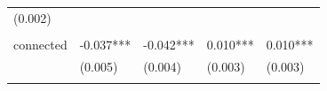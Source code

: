 \documentclass[]{book}
\begin{document}
\begin{longtable}[]{@{}lllll@{}}
\begin{minipage}[t]{0.18\columnwidth}
(0.002)\strut
\end{minipage}\tabularnewline
\begin{minipage}[t]{0.15\columnwidth}\raggedright\strut
\strut
\end{minipage} & \begin{minipage}[t]{0.17\columnwidth}\raggedright\strut
\strut
\end{minipage} & \begin{minipage}[t]{0.17\columnwidth}\raggedright\strut
\strut
\end{minipage} & \begin{minipage}[t]{0.18\columnwidth}\raggedright\strut
\strut
\end{minipage} & \begin{minipage}[t]{0.18\columnwidth}\raggedright\strut
\strut
\end{minipage}\tabularnewline
\begin{minipage}[t]{0.15\columnwidth}\raggedright\strut
connected\strut
\end{minipage} & \begin{minipage}[t]{0.17\columnwidth}\raggedright\strut
-0.037***\strut
\end{minipage} & \begin{minipage}[t]{0.17\columnwidth}\raggedright\strut
-0.042***\strut
\end{minipage} & \begin{minipage}[t]{0.18\columnwidth}\raggedright\strut
0.010***\strut
\end{minipage} & \begin{minipage}[t]{0.18\columnwidth}\raggedright\strut
0.010***\strut
\end{minipage}\tabularnewline
\begin{minipage}[t]{0.15\columnwidth}\raggedright\strut
\strut
\end{minipage} & \begin{minipage}[t]{0.17\columnwidth}\raggedright\strut
(0.005)\strut
\end{minipage} & \begin{minipage}[t]{0.17\columnwidth}\raggedright\strut
(0.004)\strut
\end{minipage} & \begin{minipage}[t]{0.18\columnwidth}\raggedright\strut
(0.003)\strut
\end{minipage} & \begin{minipage}[t]{0.18\columnwidth}\raggedright\strut
(0.003)\strut
\end{minipage}\tabularnewline
\begin{minipage}[t]{0.15\columnwidth}\raggedright\strut

\end{minipage}
\end{longtable}
\end{document}
